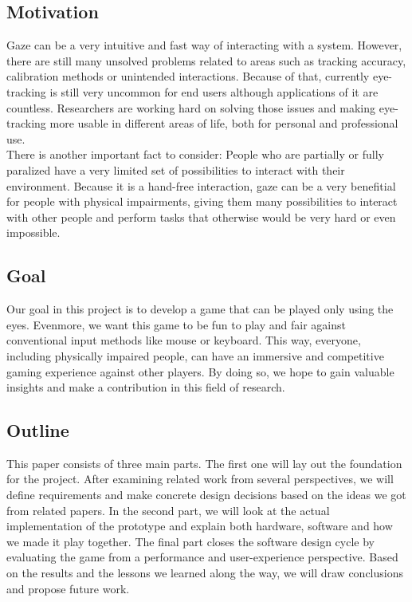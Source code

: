 \documentclass{sigchi}
\begin{document}
\subsection{Motivation}
Gaze can be a very intuitive and fast way of interacting with a system. However, there are still many unsolved problems related to areas such as tracking accuracy, calibration methods or unintended interactions. Because of that, currently eye-tracking is still very uncommon for end users although applications of it are countless. Researchers are working hard on solving those issues and making eye-tracking more usable in different areas of life, both for personal and professional use.\\
There is another important fact to consider: People who are partially or fully paralized have a very limited set of possibilities to interact with their environment. Because it is a hand-free interaction, gaze can be a very benefitial for people with physical impairments, giving them many possibilities to interact with other people and perform tasks that otherwise would be very hard or even impossible.

\subsection{Goal}
Our goal in this project is to develop a game that can be played only using the eyes. Evenmore, we want this game to be fun to play and fair against conventional input methods like mouse or keyboard. This way, everyone, including physically impaired people, can have an immersive and competitive gaming experience against other players. By doing so, we hope to gain valuable insights and make a contribution in this field of research.

\subsection{Outline}
This paper consists of three main parts. The first one will lay out the foundation for the project. After examining related work from several perspectives, we will define requirements and make concrete design decisions based on the ideas we got from related papers. In the second part, we will look at the actual implementation of the prototype and explain both hardware, software and how we made it play together. The final part closes the software design cycle by evaluating the game from a performance and user-experience perspective. Based on the results and the lessons we learned along the way, we will draw conclusions and propose future work.
\end{document}
